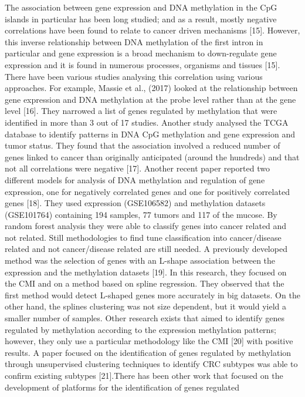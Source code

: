 \documentclass[10pt,letterpaper]{article}
\begin{document}
The association between gene expression and DNA methylation in the CpG
islands in particular has been long studied; and as a result, mostly
negative correlations have been found to relate to cancer driven
mechanisms {[}15{]}. However, this inverse relationship between DNA
methylation of the first intron in particular and gene expression is a
broad mechanism to down-regulate gene expression and it is found in
numerous processes, organisms and tissues {[}15{]}. There have been
various studies analysing this correlation using various approaches. For
example, Massie et al., (2017) looked at the relationship between gene
expression and DNA methylation at the probe level rather than at the
gene level {[}16{]}. They narrowed a list of genes regulated by methylation 
that were identified in more than 3 out of 17 studies. Another study analysed
the TCGA database to identify patterns in DNA CpG methylation and gene
expression and tumor status. They found that the association involved a
reduced number of genes linked to cancer than originally anticipated
(around the hundreds) and that not all correlations were negative
{[}17{]}. Another recent paper reported two different models for
analysis of DNA methylation and regulation of gene expression, one for
negatively correlated genes and one for positively correlated genes
{[}18{]}. They used expression (GSE106582) and methylation
datasets (GSE101764) containing 194 samples, 77 tumors and 117 of the
mucose. By random forest analysis they were able to classify genes into
cancer related and not related. Still methodologies to find tune
classification into cancer/disease related and not cancer/disease
related are still needed. A previously developed method was the
selection of genes with an L-shape association between the expression
and the methylation datasets {[}19{]}. In this
research, they focused on the CMI and on a method based on spline
regression. They observed that the first method would detect L-shaped
genes more accurately in big datasets. On the other hand, the splines
clustering was not size dependent, but it would yield a smaller number
of samples. Other research exists that aimed to identify genes regulated
by methylation according to the expression methylation patterns;
however, they only use a particular methodology like the CMI
{[}20{]} with positive results. A paper focused on the
identification of genes regulated by methylation through unsupervised
clustering techniques to identify CRC subtypes was able to confirm
existing subtypes {[}21{]}.There has been other work that focused on
the development of platforms for the identification of genes regulated
\end{document}
